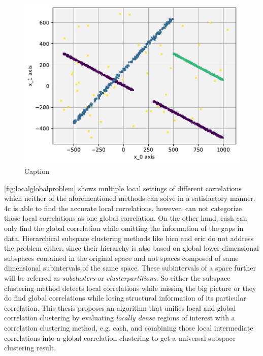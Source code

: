 \begin{figure}
    \centering
    \includegraphics[width=.6\textwidth]{figures_method/Groundtruth.pdf}
    \caption{Caption}
    \label{fig:localglobalproblem}
\end{figure}

\autoref{fig:localglobalproblem}  shows multiple local settings of different correlations which neither of the aforementioned methods can solve in a satisfactory manner. \gls{4c} is able to find the accurate local correlations, however, can not categorize those local correlations as one global correlation. 
On the other hand, \gls{cash} can only find the global correlation while omitting the information of the gaps in data. Hierarchical subspace clustering methods like \acrshort{hico} and \acrshort{eric} do not address the problem either, since their hierarchy is also based on global lower-dimensional subspaces contained in the original space and not spaces composed of same dimensional subintervals of the same space. These subintervals of a space further will be referred as \textit{subclusters} or \textit{clusterpartitions}.
So either the subspace clustering method detects local correlations while missing the big picture or they do find global correlations while losing structural information of its particular correlation. This thesis proposes an algorithm that unifies local and global correlation clustering by evaluating \textit{locally dense} regions of interest with a correlation clustering method, e.g. \gls{cash}, and combining those local intermediate correlations into a global correlation clustering to get a universal subspace clustering result. 


